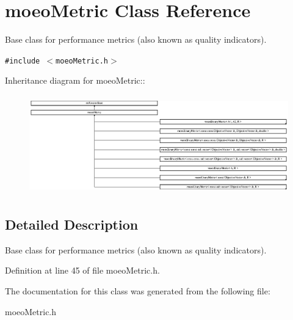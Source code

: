 \section{moeo\-Metric Class Reference}
\label{classmoeoMetric}
Base class for performance metrics (also known as quality indicators).  


{\tt \#include $<$moeo\-Metric.h$>$}

Inheritance diagram for moeo\-Metric::\begin{figure}[H]
\begin{center}
\leavevmode
\includegraphics[height=4.31433cm]{classmoeoMetric}
\end{center}
\end{figure}


\subsection{Detailed Description}
Base class for performance metrics (also known as quality indicators). 



Definition at line 45 of file moeo\-Metric.h.

The documentation for this class was generated from the following file:\begin{CompactItemize}
\item 
moeo\-Metric.h\end{CompactItemize}
